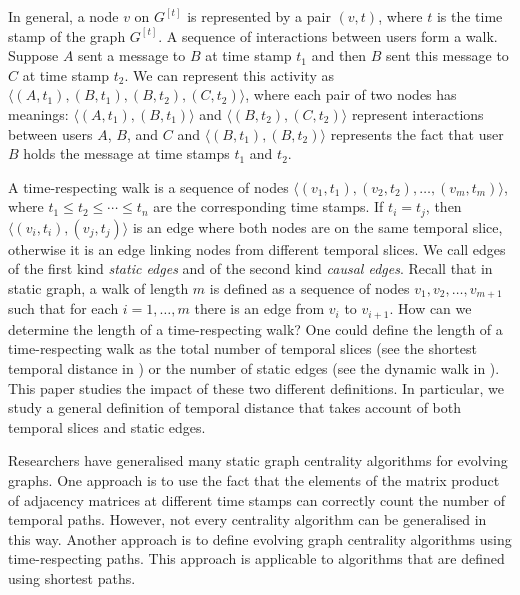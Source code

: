\documentclass[12pt]{article}
\theoremstyle{definition}
\begin{document}
In general, a node $v$ on $G^{[t]}$ is represented by a pair $(v, t)$, where $t$ is the time stamp of the graph $G^{[t]}$.
A sequence of interactions between users form a walk. Suppose $A$ sent a message to $B$ at time stamp $t_1$
and then $B$ sent this message to $C$ at time stamp $t_2$. We can represent this activity as $\langle (A,t_1), (B,t_1), (B, t_2), (C,t_2)\rangle$, where each pair of two nodes has meanings: $\langle (A,t_1), (B,t_1) \rangle$ and $\langle (B,t_2), (C,t_2) \rangle$ represent interactions between users $A$, $B$, and $C$ and $\langle (B,t_1), (B,t_2) \rangle$ represents the fact that user $B$ holds the message at time stamps $t_1$ and $t_2$.

A time-respecting walk is a sequence of nodes $\langle (v_1, t_1), (v_2, t_2), \ldots ,(v_m, t_m)\rangle$, where $t_1 \le t_2 \le \cdots \le t_n$ are the corresponding time stamps. If $t_i = t_j$, then $\langle (v_i, t_i), (v_j, t_j) \rangle$ is an edge where both nodes are on the same temporal slice,  otherwise it is an edge linking nodes from different temporal slices.
We call edges of the first kind \emph{static edges} and of the second kind \emph{causal edges}.
Recall that in static graph, a walk of length $m$ is defined as a sequence of nodes $v_1, v_2, \ldots, v_{m+1}$ such that for each $i = 1, \ldots, m$ there is an edge from $v_i$ to $v_{i+1}$. How can we  determine the length of a time-respecting walk?
One could define the length of a time-respecting walk as the total number of temporal slices (see the shortest temporal distance in \cite{tmml09}) or the number of static edges (see the dynamic walk in \cite{gphe11}). This paper studies the impact of these two different definitions. In particular, we study a general definition of temporal distance that takes account of both temporal slices and static edges.


Researchers have generalised many static graph centrality algorithms for evolving graphs. One approach is to use the fact that the elements of the matrix product of adjacency matrices at different time stamps can correctly count the number of temporal paths.
However, not every centrality algorithm can be generalised in this way. Another approach is to define evolving graph centrality algorithms using time-respecting paths. This approach is applicable to algorithms that are defined using shortest paths.
\end{document}
